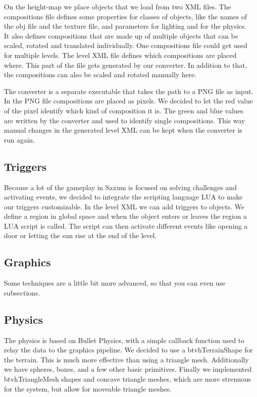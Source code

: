 \documentclass[sponsored]{acmsiggraph}
\begin{document}
On the height-map we place objects that we load from two XML files. The compositions file defines some properties for classes of objects, like the names of the obj file and the texture file, and parameters for lighting and for the physics. It also defines compositions that are made up of multiple objects that can be scaled, rotated and translated individually. One compositions file could get used for multiple levels. The level XML file defines which compositions are placed where. This part of the file gets generated by our converter. In addition to that, the compositions can also be scaled and rotated manually here.

The converter is a separate executable that takes the path to a PNG file as input. In the PNG file compositions are placed as pixels.
We decided to let the red value of the pixel identify which kind of composition it is. The green and blue values are written by the converter and used to identify single compositions. This way manual changes in the generated level XML can be kept when the converter is run again.

\subsection{Triggers}

Because a lot of the gameplay in Saxum is focused on solving challenges and activating events, we decided to integrate the scripting language LUA to make our triggers customizable. In the level XML we can add triggers to objects. We define a region in global space and when the object enters or leaves the region a LUA script is called. The script can then activate different events like opening a door or letting the sun rise at the end of the level.

\subsection{Graphics}

Some techniques are a little bit more advanced, so that you can even use subsections.

\subsection{Physics}

The physics is based on Bullet Physics, with a simple callback function used to relay the data to the graphics pipeline. We decided to use  a btvhTerrainShape for the terrain. This is much more effective than using a triangle mesh. Additionally we have spheres, boxes, and a few other basic primitives. Finally we implemented btvhTriangleMesh shapes and concave triangle meshes, which are more strenuous for the system, but allow for moveable triangle meshes.
\end{document}
